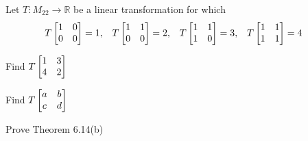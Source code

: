 \documentclass[oneperpage]{gsypset}
\begin{document}
	\begin{problem}[6.3.18]
		Let $T \colon M_{22} \to \mathbb{R}$ be a linear transformation for which
		\begin{align*}
			T\begin{bmatrix}1&0\\0&0\end{bmatrix} &= 1, &
			T\begin{bmatrix}1&1\\0&0\end{bmatrix} &= 2, &
			T\begin{bmatrix}1&1\\1&0\end{bmatrix} &= 3, &
			T\begin{bmatrix}1&1\\1&1\end{bmatrix} &= 4
		\end{align*}
		\begin{subproblems}[label=\textbullet]
			\subproblem Find $T\begin{bmatrix}1&3\\4&2\end{bmatrix}$
			\begin{solution}
				
			\end{solution}
			
			\subproblem Find $T\begin{bmatrix}a&b\\c&d\end{bmatrix}$
			\begin{solution}
				
			\end{solution}
		\end{subproblems}
	\end{problem}
	
	\begin{problem}[6.3.21]
		Prove Theorem 6.14(b)
		
	\end{problem}
	\begin{solution}
		
	\end{solution}
	
\end{document}
